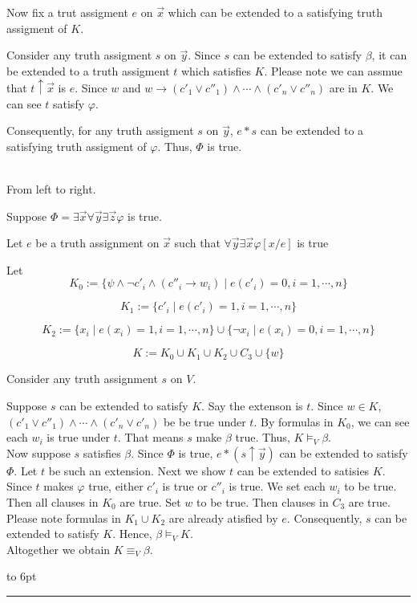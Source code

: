 \documentclass[12pt]{article}
\newenvironment{proof}{\parindent=0pt{\bf Proof: }}{
   \hspace*{\fill}\hbox to 6pt{\leaders\hrule width 6pt height 6pt\hfill}\par}
\begin{document}
\begin{proof}
Now fix a trut assigment $e$ on $\vec{x}$ which can be extended to a satisfying truth assigment of $K$.

Consider any truth assigment $s$ on $\vec{y}$. Since $s$ can be extended to satisfy $\beta$, it can be extended to a truth assigment $t$ which satisfies $K$. Please note we can assmue that $t\uparrow\vec{x}$ is $e$.
Since $w$ and $w\rightarrow (c'_1\vee c''_1)\wedge\cdots\wedge (c'_n\vee c''_n)$ are in $K$. We can see $t$ satisfy $\varphi$.

Consequently, for any truth assigment $s$ on $\vec{y}$, $e*s$ can be extended to a satisfying truth assigment of $\varphi$. Thus, $\Phi$ is true.


\ \\

{\color{red} From left to right}.\color{black}


Suppose $\Phi=\exists\vec{x}\forall\vec{y}\exists\vec{z}\varphi$ is true.

Let $e$ be a truth assignment on $\vec{x}$ such that $\forall\vec{y}\exists\vec{x}\varphi[x/e]$ is true


Let $$K_0:=\{\psi\wedge \neg c'_i\wedge (c''_i\rightarrow w_i)\mid e(c'_i)=0, i=1,\cdots,n\}$$

$$K_1:=\{c'_i\mid e(c'_i)=1, i=1,\cdots,n\}$$

$$K_2:=\{x_i\mid e(x_i)=1, i=1,\cdots, n\}\cup\{\neg x_i\mid e(x_i)=0, i=1,\cdots,n\}$$

$$K:=K_0\cup K_1\cup K_2\cup C_3\cup\{w\}$$

Consider any truth assignment $s$ on $V$.

Suppose $s$ can be extended to satisfy $K$. Say the extenson is $t$. Since $w\in K$, $(c'_1\vee c''_1)\wedge\cdots\wedge(c'_n\vee c'_n)$ be be true under $t$. By formulas in $K_0$, we can see each $w_i$ is true under $t$. That means $s$ make $\beta$ true. Thus, $K\models_V\beta$. \\

Now suppose $s$ satisfies $\beta$. Since $\Phi$ is true, $e*(s\uparrow\vec{y})$ can  be extended to satisfy $\Phi$. Let $t$ be such an extension. Next we show $t$ can be extended to satisies $K$. Since $t$ makes $\varphi$ true, either $c'_i$ is true or $c''_i$ is true. We set each $w_i$ to be true. Then all clauses in $K_0$ are true. Set $w$ to be true. Then clauses in $C_3$ are true. Please note formulas in $K_1\cup K_2$ are already atisfied by $e$. Consequently, $s$ can be extended to satisfy $K$.
Hence, $\beta\models_V K$.\\

Altogether we obtain $K\equiv_V \beta$.
\end{proof}
\end{document}
